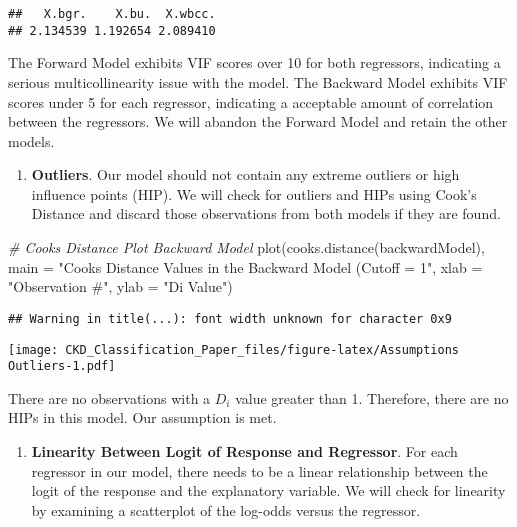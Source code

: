 \documentclass[
]{article}
\newenvironment{Shaded}{\begin{snugshade}}{\end{snugshade}}
\newcommand{\AttributeTok}[1]{\textcolor[rgb]{0.77,0.63,0.00}{#1}}
\newcommand{\CommentTok}[1]{\textcolor[rgb]{0.56,0.35,0.01}{\textit{#1}}}
\newcommand{\FunctionTok}[1]{\textcolor[rgb]{0.00,0.00,0.00}{#1}}
\newcommand{\NormalTok}[1]{#1}
\newcommand{\StringTok}[1]{\textcolor[rgb]{0.31,0.60,0.02}{#1}}
\providecommand{\tightlist}{%
  \setlength{\itemsep}{0pt}\setlength{\parskip}{0pt}}
\begin{document}
\begin{verbatim}
##   X.bgr.    X.bu.  X.wbcc. 
## 2.134539 1.192654 2.089410
\end{verbatim}

The Forward Model exhibits VIF scores over 10 for both regressors,
indicating a serious multicollinearity issue with the model. The
Backward Model exhibits VIF scores under 5 for each regressor,
indicating a acceptable amount of correlation between the regressors. We
will abandon the Forward Model and retain the other models.

\begin{enumerate}
\def\labelenumi{\arabic{enumi}.}
\setcounter{enumi}{3}
\tightlist
\item
  \textbf{Outliers}. Our model should not contain any extreme outliers
  or high influence points (HIP). We will check for outliers and HIPs
  using Cook's Distance and discard those observations from both models
  if they are found.
\end{enumerate}

\begin{Shaded}
\begin{Highlighting}[]
\CommentTok{\# Cook\textquotesingle{}s Distance Plot Backward Model}
\FunctionTok{plot}\NormalTok{(}\FunctionTok{cooks.distance}\NormalTok{(backwardModel), }\AttributeTok{main =} \StringTok{"Cook\textquotesingle{}s Distance Values in the }
\StringTok{     Backward Model (Cutoff = 1"}\NormalTok{, }\AttributeTok{xlab =} \StringTok{"Observation \#"}\NormalTok{, }\AttributeTok{ylab =} \StringTok{"Di Value"}\NormalTok{)}
\end{Highlighting}
\end{Shaded}

\begin{verbatim}
## Warning in title(...): font width unknown for character 0x9
\end{verbatim}

\texttt{[image: CKD\_Classification\_Paper\_files/figure-latex/Assumptions Outliers-1.pdf]}

There are no observations with a \(D_{i}\) value greater than 1.
Therefore, there are no HIPs in this model. Our assumption is met.

\begin{enumerate}
\def\labelenumi{\arabic{enumi}.}
\setcounter{enumi}{4}
\tightlist
\item
  \textbf{Linearity Between Logit of Response and Regressor}. For each
  regressor in our model, there needs to be a linear relationship
  between the logit of the response and the explanatory variable. We
  will check for linearity by examining a scatterplot of the log-odds
  versus the regressor.
\end{enumerate}
\end{document}
